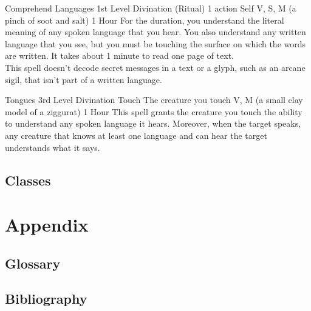 \documentclass[10pt,twoside,twocolumn,openany,nomultitoc]{book}
\begin{document}
    \DndSpellHeader%
      {Comprehend Languages}
      {1st Level Divination (Ritual)}
      {1 action}
      {Self}
      {V, S, M (a pinch of soot and salt)}
      {1 Hour}
    For the duration, you understand the literal meaning of any spoken language that you hear. You also understand any written language that you see, but you must be touching the surface on which the words are written. It takes about 1 minute to read one page of text. \\
    This spell doesn’t decode secret messages in a text or a glyph, such as an arcane sigil, that isn’t part of a written language.        
    
    \DndSpellHeader%
      {Tongues}
      {3rd Level Divination}
      {Touch}
      {The creature you touch}
      {V, M (a small clay model of a ziggurat)}
      {1 Hour}
    This spell grants the creature you touch the ability to understand any spoken language it hears. Moreover, when the target speaks, any creature that knows at least one language and can hear the target understands what it says.

            
\section{Classes}

\chapter{Appendix}
\section{Glossary}
\printglossaries


\section{Bibliography}
\begingroup
\let\clearpage\relax

    \nocite{*}

    \endgroup




\end{document}
